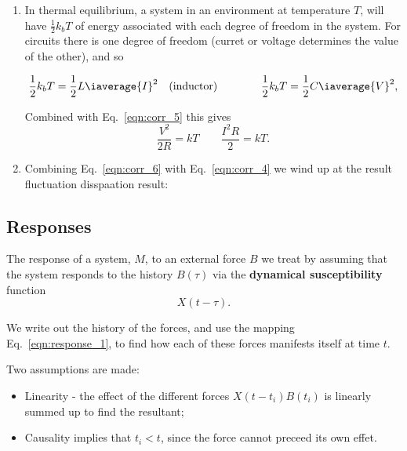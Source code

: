 \begin{enumerate}
  	\item In thermal equilibrium, a system in an environment at temperature $ T $, will have $ \frac{1}{2}k_bT $ of energy associated with each degree of freedom in the system. For circuits there is one degree of freedom (curret or voltage determines the value of the other), and so
  	
  	\begin{equation}\label{key}
  		\frac{1}{2}k_bT=\frac{1}{2}L\iaverage{I}^2 \quad(\text{inductor})\qquad\qquad \frac{1}{2}k_bT = \frac{1}{2}C\iaverage{V}^2,
  	\end{equation}
  	
  	\noindent Combined with Eq.~\eqref{eqn:corr_5} this gives
  	\begin{equation}\label{eqn:corr_6}
  	\frac{V^2}{2R} = kT\qquad \frac{I^2R}{2} = kT.
  	\end{equation}
  	
  	\item Combining Eq.~\eqref{eqn:corr_6} with Eq.~\eqref{eqn:corr_4} we wind up at the result fluctuation disspaation result:
  \end{enumerate}  
 
 \newpage\subsection{Responses}
  The response of a system, $ M$, to an external force $ B $ we treat by assuming that the system responds to the history $ B(\tau) $ via the \textbf{dynamical susceptibility} function
  \begin{equation}\label{eqn:response_1}
  	X(t-\tau).
  \end{equation}
  
  \noindent We write out the history of the forces, and use the mapping Eq.~\eqref{eqn:response_1}, to find how each of these forces manifests itself at time $ t $. 
  
 
  Two assumptions are made:
  \begin{itemize}
 	\item Linearity - the effect of the different forces $ X(t-t_i)B(t_i) $ is linearly summed up to find the resultant;
 	\item Causality implies that $ t_i < t $, since the force cannot preceed its own effet.
  \end{itemize}

